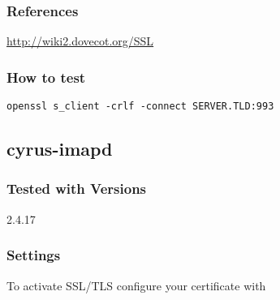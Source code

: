 

\subsubsection{References}
\begin{itemize*}
  \item \url{http://wiki2.dovecot.org/SSL}
\end{itemize*}


\subsubsection{How to test}
\begin{lstlisting}
openssl s_client -crlf -connect SERVER.TLD:993
\end{lstlisting}


\subsection{cyrus-imapd}
\subsubsection{Tested with Versions}
\begin{itemize*}
  \item 2.4.17
\end{itemize*}

\subsubsection{Settings}

To activate SSL/TLS configure your certificate with

